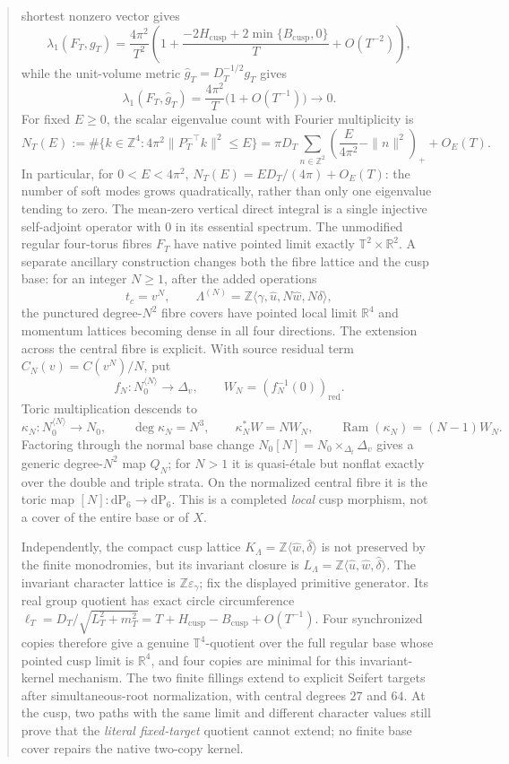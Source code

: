 \documentclass[11pt,letterpaper]{article}
\theoremstyle{definition}
\theoremstyle{remark}
\begin{document}
\begin{abstract}
 shortest nonzero vector gives
 \[
  \lambda_1(F_T,g_T)
  =\frac{4\pi^2}{T^2}
    \left(1+\frac{-2H_{\mathrm{cusp}}
    +2\min\{B_{\mathrm{cusp}},0\}}T+O(T^{-2})\right),
 \]
 while the unit-volume metric
 \(\widehat g_T=D_T^{-1/2}g_T\) gives
 \[
 \lambda_1(F_T,\widehat g_T)
  =\frac{4\pi^2}{T}\bigl(1+O(T^{-1})\bigr)\longrightarrow0.
\]
 For fixed \(E\geq0\), the scalar eigenvalue count with Fourier
 multiplicity is
 \[
  N_T(E):=\#\{k\in\mathbb Z^4:
  4\pi^2\|P_T^{-\top}k\|^2\leq E\}
  =\pi D_T\sum_{n\in\mathbb Z^2}
   \left(\frac{E}{4\pi^2}-\|n\|^2\right)_+ +O_E(T).
 \]
 In particular, for \(0<E<4\pi^2\),
 \(N_T(E)=ED_T/(4\pi)+O_E(T)\): the number of soft modes grows
 quadratically, rather than only one eigenvalue tending to zero.
 The mean-zero vertical direct integral is a single injective self-adjoint
 operator with \(0\) in its essential spectrum.  The unmodified regular
 four-torus fibres \(F_T\) have native pointed limit exactly
 \(\mathbb T^2\times\mathbb R^2\).  A separate ancillary construction changes
 both the fibre lattice and the cusp base: for an integer \(N\geq1\), after
 the added operations
 \[
  t_c=v^N,\qquad
  \Lambda^{(N)}
  =\mathbb Z\langle\widehat\gamma,\widehat u,
     N\widehat w,N\widehat\delta\rangle,
 \]
 the punctured degree-\(N^2\) fibre covers have pointed local limit
 \(\mathbb R^4\) and momentum lattices becoming dense in all four directions.
 The extension across the central fibre is explicit.  With source residual
 term \(C_N(v)=C(v^N)/N\), put
 \[
  f_N:N_0^{\langle N\rangle}\longrightarrow\Delta_v,\qquad
  W_N=(f_N^{-1}(0))_{\mathrm{red}}.
 \]
 Toric multiplication descends to
 \[
  \kappa_N:N_0^{\langle N\rangle}\longrightarrow N_0,
  \qquad \deg\kappa_N=N^3,\qquad
  \kappa_N^*W=NW_N,\qquad
  \operatorname{Ram}(\kappa_N)=(N-1)W_N.
 \]
 Factoring through the normal base change
 \(N_0[N]=N_0\times_{\Delta_t}\Delta_v\) gives a generic degree-\(N^2\)
 map \(Q_N\); for \(N>1\) it is quasi-\'etale but nonflat exactly over the
 double and triple strata.  On the normalized central fibre it is the toric
 map \([N]:\mathrm{dP}_6\to\mathrm{dP}_6\).  This is a completed
 \emph{local} cusp morphism, not a cover of the entire base or of \(X\).

 Independently, the compact cusp lattice
 \(K_\Lambda=\mathbb Z\langle\widehat w,\widehat\delta\rangle\) is not
 preserved by the finite monodromies, but its invariant closure is
 \(L_\Lambda=\mathbb Z\langle\widehat u,\widehat w,\widehat\delta\rangle\).
 The invariant character lattice is \(\mathbb Z\varepsilon_\gamma\); fix the
 displayed primitive generator.  Its real group quotient has exact circle
 circumference
 \(\ell_T=D_T/\sqrt{L_T^2+m_T^2}
 =T+H_{\mathrm{cusp}}-B_{\mathrm{cusp}}+O(T^{-1})\).  Four synchronized copies
 therefore give a genuine \(\mathbb T^4\)-quotient over the full regular base
 whose pointed cusp limit is \(\mathbb R^4\), and four copies are minimal for
 this invariant-kernel mechanism.  The two finite fillings extend to explicit
 Seifert targets after simultaneous-root normalization, with central degrees
 \(27\) and \(64\).  At the cusp, two paths with the same limit and different
 character values still prove that the \emph{literal fixed-target} quotient
 cannot extend; no finite base cover repairs the native two-copy kernel.


\end{abstract}
\end{document}
